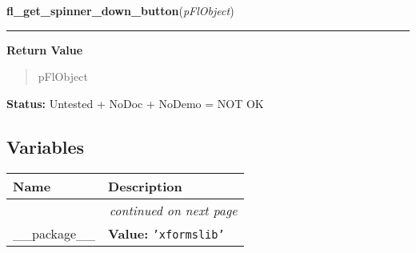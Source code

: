     \vspace{0.5ex}

\hspace{.8\funcindent}\begin{boxedminipage}{\funcwidth}

    \raggedright \textbf{fl\_get\_spinner\_down\_button}(\textit{pFlObject})

    \vspace{-1.5ex}

    \rule{\textwidth}{0.5\fboxrule}
\setlength{\parskip}{2ex}
\setlength{\parskip}{1ex}
      \textbf{Return Value}
    \vspace{-1ex}

      \begin{quote}
      pFlObject

      \end{quote}

\textbf{Status:} Untested + NoDoc + NoDemo = NOT OK



    \end{boxedminipage}



  \subsection{Variables}

    \vspace{-1cm}
\hspace{\varindent}\begin{longtable}{|p{\varnamewidth}|p{\vardescrwidth}|l}
\cline{1-2}
\cline{1-2} \centering \textbf{Name} & \centering \textbf{Description}& \\
\cline{1-2}
\endhead\cline{1-2}\multicolumn{3}{r}{\small\textit{continued on next page}}\\\endfoot\cline{1-2}
\endlastfoot\raggedright \_\-\_\-p\-a\-c\-k\-a\-g\-e\-\_\-\_\- & \raggedright \textbf{Value:} 
{\tt \texttt{'}\texttt{xformslib}\texttt{'}}&\\
\cline{1-2}
\end{longtable}

